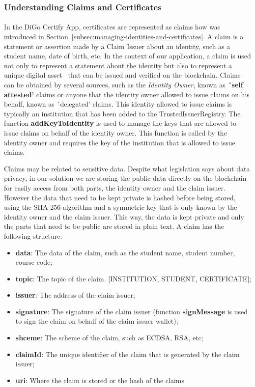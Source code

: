 \subsubsection*{Understanding Claims and Certificates}\label{subsubsec:understanding-claims-and-certificates}
\paragraph{}

In the DiGo Certify App, certificates are represented as claims how was introduced in Section~\ref{subsec:managing-identities-and-certificates}.
A claim is a statement or assertion made by a Claim Issuer about an identity, such as a student name, date of birth, etc.
In the context of our application, a claim is used not only to represent a statement about the identity but also to represent a unique digital asset~\cite{enwiki:1234201704} that can be issued and verified on the blockchain.
Claims can be obtained by several sources, such as the \textit{Identity Owner}, known as \textbf{´self attested'} claims or anyone that the identity owner allowed to issue claims on his behalf, known as ´delegated' claims. This
identity allowed to issue claims is typically an institution that has been added to the TrustedIssuerRegistry. The function \textbf{addKeyToIdentity} is used to manage the keys that are allowed to issue claims on behalf of the identity owner. This function is called by the identity owner and requires the key of the institution that is allowed to issue claims.

Claims may be related to sensitive data. Despite what legislation says about data privacy, in our solution we are storing the public data directly on the blockchain for easily access from both parts, the identity owner and the claim issuer.
However the data that need to be kept private is hashed before being stored, using the SHA-256 algorithm and a symmetric key that is only known by the identity owner and the claim issuer. This way, the data is kept private and only the parts that need to be public are stored in plain text.
A claim has the following structure:
\begin{itemize}
    \item \textbf{data}: The data of the claim, such as the student name, student number, course code;
    \item \textbf{topic}: The topic of the claim. [INSTITUTION, STUDENT, CERTIFICATE];
    \item \textbf{issuer}: The address of the claim issuer;
    \item \textbf{signature}: The signature of the claim issuer (function \textbf{signMessage} is used to sign the claim on behalf of the claim issuer wallet);
    \item \textbf{shceme}: The scheme of the claim, such as ECDSA, RSA, etc;
    \item \textbf{claimId}: The unique identifier of the claim that is generated by the claim issuer;
    \item \textbf{uri}: Where the claim is stored or the hash of the claims
\end{itemize}

